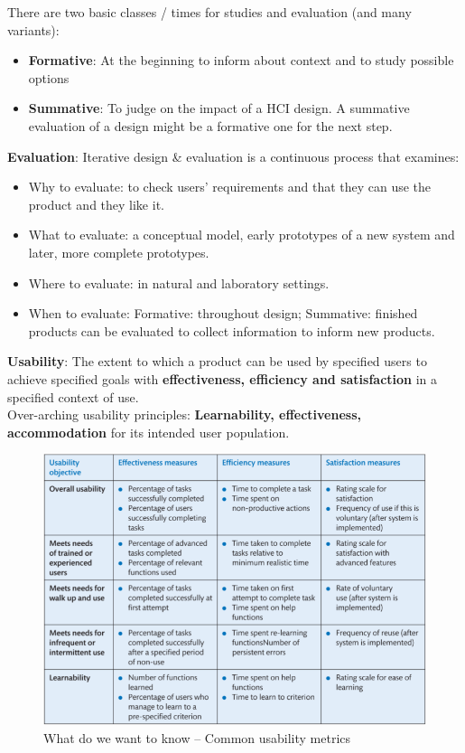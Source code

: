 There are two basic classes / times for studies and evaluation (and many variants):
\begin{itemize}
\item \textbf{Formative}: At the beginning to inform about context and to study possible options
\item \textbf{Summative}: To judge on the impact of a HCI design.
A summative evaluation of a design might be a
formative one for the next step.
\end{itemize}
\textbf{Evaluation}: Iterative design \& evaluation is a continuous process that examines:
\begin{itemize}
\item Why to evaluate: to check users’ requirements and that they can use the product and they like it.
\item What to evaluate: a conceptual model, early prototypes of a new system and later, more complete prototypes.
\item Where to evaluate: in natural and laboratory settings.
\item When to evaluate: Formative: throughout design; Summative: finished products can be evaluated to collect information to inform new products.
\end{itemize}
\textbf{Usability}: The extent to which a product can be used by specified users to achieve specified goals with \textbf{effectiveness, efficiency and satisfaction} in a specified context of use.\\
 Over-arching usability principles: \textbf{Learnability, effectiveness, accommodation} for its intended user population.
 \begin{figure}[h!]
			\centering
			\includegraphics[width=\textwidth]{img/ch01_usab.png}
			\caption{What do we want to know -- Common usability metrics}
			\label{HAP}
		\end{figure} 
